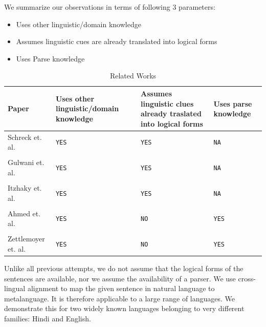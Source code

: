 \def\DevnagVersion{2.15}\documentclass[12pt]{article}
\begin{document}
We summarize our observations in terms of following 3 parameters:
\begin{itemize}
\item Uses other linguistic/domain knowledge
\item Assumes linguistic cues are already translated into logical forms
\item Uses Parse knowledge
\end{itemize}

\begin{table}[H]
\smallskip
\begin{center}
\begin{tabular}{p{}p{}p{}p{}}
\hline
\bf{\small Paper} & \bf{\small Uses other linguistic/domain knowledge} & \bf{\small Assumes linguistic clues already traslated into logical forms} & \bf{\small Uses parse knowledge}\\[0.2cm]\hline
Schreck et. al.\cite{schreck2012geometric} & \texttt{YES} & \texttt{YES} & \texttt{NA}\\\\
Gulwani et. al.\cite{gulwani2011synthesizing} & \texttt{YES} & \texttt{YES} & \texttt{NA}\\\\
Itzhaky et. al.\cite{itzhaky2012solving} & \texttt{YES} & \texttt{YES} & \texttt{NA}\\\\
Ahmed et. al.\cite{ahmed2012can} & \texttt{YES} & \texttt{NO} & \texttt{YES}\\\\
Zettlemoyer et. al.\cite{zettlemoyer2012learning} & \texttt{YES} & \texttt{NO} & \texttt{YES}\\
\hline
\end{tabular}
\caption{Related Works}
\end{center}
\end{table}

Unlike all previous attempts, we do not assume that the logical forms of the sentences are available, nor we assume the availability of a parser. We use cross-lingual alignment to map the given sentence in natural language to metalanguage. It is therefore applicable to a large range of languages. We demonstrate this for two widely known languages belonging to very different families: Hindi and English.
\end{document}
